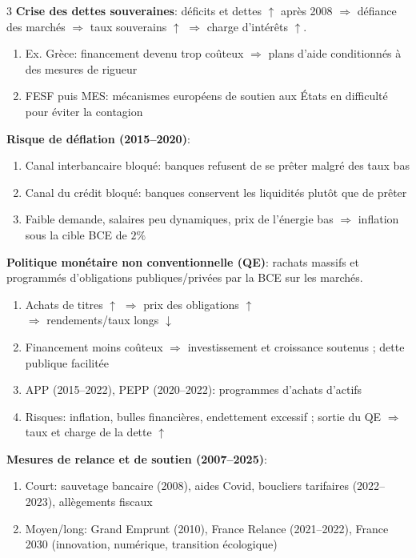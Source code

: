 \documentclass[12pt, a4paper]{article}
\begin{document}
\begin{multicols*}{3}
\textbf{Crise des dettes souveraines}: déficits et dettes $\uparrow$ après 2008 $\Rightarrow$ défiance des marchés $\Rightarrow$ taux souverains $\uparrow$ $\Rightarrow$ charge d'intérêts $\uparrow$.
\begin{enumerate}[\roman*.]
  \item Ex. Grèce: financement devenu trop coûteux $\Rightarrow$ plans d'aide conditionnés à des mesures de rigueur
  \item FESF puis MES: mécanismes européens de soutien aux États en difficulté pour éviter la contagion
\end{enumerate}

\colbreak
\textbf{Risque de déflation (2015--2020)}:
\begin{enumerate}[\roman*.]
  \item Canal interbancaire bloqué: banques refusent de se prêter malgré des taux bas
  \item Canal du crédit bloqué: banques conservent les liquidités plutôt que de prêter
  \item Faible demande, salaires peu dynamiques, prix de l'énergie bas $\Rightarrow$ inflation sous la cible BCE de $2\%$
\end{enumerate}

\textbf{Politique monétaire non conventionnelle (QE)}: rachats massifs et programmés d'obligations publiques/privées par la BCE sur les marchés.
\begin{enumerate}[\roman*.]
  \item Achats de titres $\uparrow$ $\Rightarrow$ prix des obligations $\uparrow$ \\$\Rightarrow$ rendements/taux longs $\downarrow$
  \item Financement moins coûteux $\Rightarrow$ investissement et croissance soutenus ; dette publique facilitée
  \item APP (2015--2022), PEPP (2020--2022): programmes d'achats d'actifs
  \item Risques: inflation, bulles financières, endettement excessif ; sortie du QE $\Rightarrow$ taux et charge de la dette $\uparrow$
\end{enumerate}

\textbf{Mesures de relance et de soutien (2007--2025)}:
\begin{enumerate}[\roman*.]
  \item Court: sauvetage bancaire (2008), aides Covid, boucliers tarifaires (2022--2023), allègements fiscaux
  \item Moyen/long: Grand Emprunt (2010), France Relance (2021--2022), France 2030 (innovation, numérique, transition écologique)
\end{enumerate}


\end{multicols*}
\end{document}
